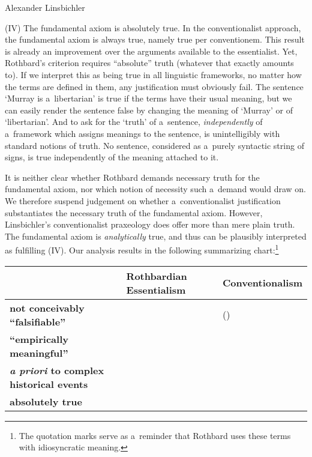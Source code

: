 \begin{artengenv}{Alexander Linsbichler}
\medskip

\noindent (IV) The fundamental axiom is absolutely true. In the conventionalist approach, the fundamental axiom is always true, namely true per conventionem. This result is already an improvement over the arguments available to the essentialist. Yet, Rothbard's criterion requires ``absolute'' truth (whatever that exactly amounts to). If we interpret this as being true in all linguistic frameworks, no matter how the terms are defined in them, any justification must obviously fail. The sentence ‘Murray is a~libertarian' is true if the terms have their usual meaning, but we can easily render the sentence false by changing the meaning of ‘Murray' or of ‘libertarian'. And to ask for the ‘truth' of a~sentence, \textit{independently} of a~framework which assigns meanings to the sentence, is unintelligibly with standard notions of truth. No sentence, considered as a~purely syntactic string of signs, is true independently of the meaning attached to it.



It is neither clear whether Rothbard demands necessary truth for the fundamental axiom, nor which notion of necessity such a~demand would draw on. We therefore suspend judgement on whether a~conventionalist justification substantiates the necessary truth of the fundamental axiom. However, Linsbichler's conventionalist praxeology does offer more than mere plain truth. The fundamental axiom is \textit{analytically} true, and thus can be plausibly interpreted as fulfilling (IV). Our analysis results in the following summarizing chart:\footnote{The quotation marks serve as a~reminder that Rothbard uses these terms with idiosyncratic meaning.}






\begin{table}[H]
    \centering
    \begin{adjustbox}{max width=\textwidth}
        \begin{tabularx}{\textwidth}{|L{4.5cm}|Y|Y|}
            \hline
            & \textbf{Rothbardian Essentialism} & \textbf{Conven\-tion\-alism} \\ \hline
            \textbf{not conceivably ``falsifiable''} &  & () \\ \hline
            \textbf{``empirically meaningful''} &  &  \\ \hline
            \textbf{\textit{a priori} to complex historical events} &  &  \\ \hline
            \textbf{absolutely true} &  &  \\ \hline
        \end{tabularx}
    \end{adjustbox}
\end{table}


\end{artengenv}
